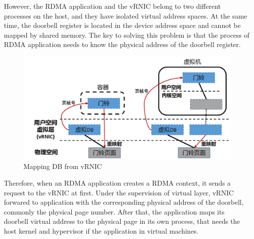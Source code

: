 However, the RDMA application and the vRNIC belong to two different processes on the host, and they have isolated virtual address spaces. At the same time, the doorbell register is located in the device address space and cannot be mapped by shared memory. The key to solving this problem is that the process of RDMA application needs to know the physical address of the doorbell register.

\begin{figure}[!ht]
	\centering
	\includegraphics[width=1.0\linewidth]{images/by-pass}
	\caption{Mapping DB from vRNIC}
	\label{fig:by-pass}
\end{figure}

Therefore, when an RDMA application creates a RDMA context, it sends a request to the vRNIC at first. Under the supervision of virtual layer, vRNIC forwared to application with the corresponding physical address of the doorbell, commonly the physical page number. After that, the application maps its doorbell virtual address to the physical page in its own process, that needs the host kernel and hypervisor if the application in virtual machines.

